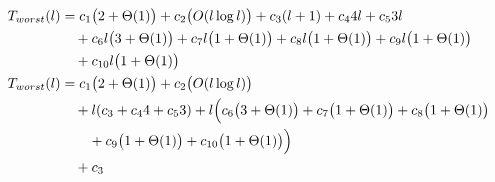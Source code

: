 \begin{subequations}
\label{eq:mergelines-merge-1}
\begin{align}
\label{eq:mergelines-merge-1-1}
T_{worst}(l)& =
c_{1}\bigl(2 + \Theta(1)\bigr)
+ c_{2}\bigl(O(l \log l)\bigr)
+ c_{3}(l + 1)
+ c_{4}4l
+ c_{5}3l
\\
& \quad
+ c_{6}l\bigl(3 + \Theta(1)\bigr)
+ c_{7}l\bigl(1 + \Theta(1)\bigr)
+ c_{8}l\bigl(1 + \Theta(1)\bigr)
+ c_{9}l\bigl(1 + \Theta(1)\bigr)
\nonumber \\
& \quad
+ c_{10}l\bigl(1 + \Theta(1)\bigr)
\nonumber \\
\label{eq:mergelines-merge-1-2}
T_{worst}(l)& =
c_{1}\bigl(2 + \Theta(1)\bigr) + c_{2}\bigl(O(l \log l)\bigr)
\\
& \quad
+ l(c_{3} + c_{4}4 + c_{5}3)
+ l\Bigl(c_{6}\bigl(3 + \Theta(1)\bigr) + c_{7}\bigl(1 + \Theta(1)\bigr) + c_{8}\bigl(1 + \Theta(1)\bigr)
\nonumber \\
& \quad \quad
+ c_{9}\bigl(1 + \Theta(1)\bigr) + c_{10}\bigl(1 + \Theta(1)\bigr)\Bigr)
\nonumber \\
& \quad
+ c_{3}
\nonumber
\end{align}
\end{subequations}
